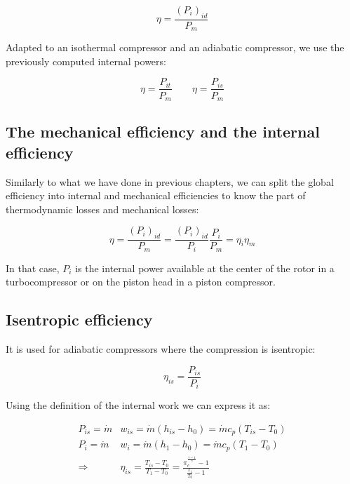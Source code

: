 \begin{equation}
\eta = \frac{(P_i)_{id}}{P_m}
\end{equation}

Adapted to an isothermal compressor and an adiabatic compressor, we use the previously computed internal powers: 

\begin{equation}
\eta = \frac{P_{it}}{P_m} \qquad \eta = \frac{P_{is}}{P_m}
\end{equation}

\subsection{The mechanical efficiency and the internal efficiency}
Similarly to what we have done in previous chapters, we can split the global efficiency into internal and mechanical efficiencies to know the part of thermodynamic losses and mechanical losses: 

\begin{equation}
\eta = \frac{(P_i)_{id}}{P_m} = \frac{(P_i)_{id}}{P_i} \frac{P_i}{P_m} = \eta _i \eta _m
\end{equation}

In that case, $P_i$ is the internal power available at the center of the rotor in a turbocompressor or on the piston head in a piston compressor. 

\subsection{Isentropic efficiency}
It is used for adiabatic compressors where the compression is isentropic: 

\begin{equation}
\eta _{is} = \frac{P_{is}}{P_i}
\end{equation}

Using the definition of the internal work we can express it as: 

\begin{equation}
\begin{aligned}
P_{is}= \dot{m} &w_{is} = \dot{m}(h_{is}-h_0) = \dot{m} c_p (T_{is} - T_0)\\
P_{i}= \dot{m} &w_{i} = \dot{m}(h_{1}-h_0) = \dot{m} c_p (T_{1} - T_0)\\
\Rightarrow &\eta _{is}= \frac{T_{is} - T_0}{T_{1} - T_0} = \frac{\pi _c ^{\frac{\gamma -1}{\gamma}} - 1}{\frac{T_1}{T_0} - 1}
\end{aligned}
\end{equation}

